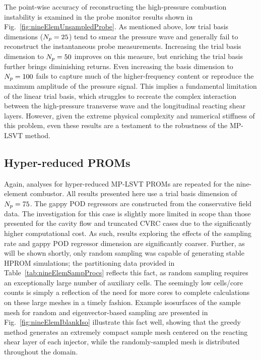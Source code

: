 The point-wise accuracy of reconstructing the high-pressure combustion instability is examined in the probe monitor results shown in Fig.~\ref{fig:nineElemUnsampledProbe}. As mentioned above, low trial basis dimensions ($N_p = 25$) tend to smear the pressure wave and generally fail to reconstruct the instantaneous probe measurements. Increasing the trial basis dimension to $N_p = 50$ improves on this measure, but enriching the trial basis further brings diminishing returns. Even increasing the basis dimension to $N_p = 100$ fails to capture much of the higher-frequency content or reproduce the maximum amplitude of the pressure signal. This implies a fundamental limitation of the linear trial basis, which struggles to recreate the complex interaction between the high-pressure transverse wave and the longitudinal reacting shear layers. However, given the extreme physical complexity and numerical stiffness of this problem, even these results are a testament to the robustness of the MP-LSVT method. 


\subsection{Hyper-reduced PROMs}

Again, analyses for hyper-reduced MP-LSVT PROMs are repeated for the nine-element combustor. All results presented here use a trial basis dimension of $N_p = 75$. The gappy POD regressors are constructed from the conservative field data. The investigation for this case is slightly more limited in scope than those presented for the cavity flow and truncated CVRC cases due to the significantly higher computational cost. As such, results exploring the effects of the sampling rate and gappy POD regressor dimension are significantly coarser. Further, as will be shown shortly, only random sampling was capable of generating stable HPROM simulations; the partitioning data provided in Table~\ref{tab:nineElemSampProcs} reflects this fact, as random sampling requires an exceptionally large number of auxiliary cells. The seemingly low cells/core counts is simply a reflection of the need for more cores to complete calculations on these large meshes in a timely fashion. Example isosurfaces of the sample mesh for random and eigenvector-based sampling are presented in Fig.~\ref{fig:nineElemIblankIso} illustrate this fact well, showing that the greedy method generates an extremely compact sample mesh centered on the reacting shear layer of each injector, while the randomly-sampled mesh is distributed throughout the domain.

